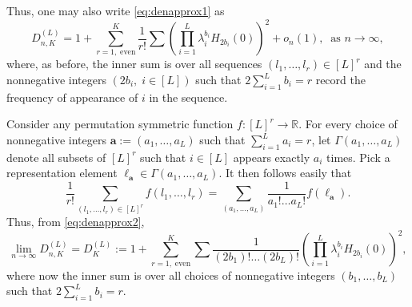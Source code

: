 \documentclass{amsart}
\newcommand{\rr}{\mathbb{R}}
\begin{document}
Thus, one may also write \eqref{eq:denapprox1} as
\begin{equation}\label{eq:denapprox2}
D_{n,K}^{(L)}= 1 +  \sum_{r=1, \; \text{even}}^K  \frac{1}{r!} \sum \left( \prod_{i=1}^L \lambda_{i}^{b_i} H_{2 b_i}(0)\right)^2 + o_n(1),\;\; \text{as $n\rightarrow \infty$},
\end{equation}
where, as before, the inner sum is over all sequences $(l_1, \ldots, l_r)\in [L]^r$ and the nonnegative integers $(2b_i,\; i\in [L])$ such that $2\sum_{i=1}^L b_i=r$ record the frequency of appearance of $i$ in the sequence.

Consider any permutation symmetric function $f:[L]^r\rightarrow \rr$. For every choice of nonnegative integers $\mathbf{a}:=(a_1, \ldots, a_L)$ such that $\sum_{i=1}^L a_i=r$, let $\Gamma(a_1, \ldots, a_L)$ denote all subsets of $[L]^r$ such that $i\in [L]$ appears exactly $a_i$ times. Pick a representation element $\ell_{\mathbf{a}} \in \Gamma(a_1, \ldots, a_L)$. It then follows easily that 
\[
\frac{1}{r!} \sum_{(l_1, \ldots, l_r)\in [L]^r} f(l_1, \ldots, l_r) = \sum_{(a_1, \ldots, a_L)} \frac{1}{a_1 ! \ldots a_L!}f(\ell_{\mathbf{a}}). 
\]
Thus, from \eqref{eq:denapprox2},
\begin{equation}\label{eq:denapprox3}
\lim_{n\rightarrow \infty}D_{n,K}^{(L)}= D_K^{(L)}:= 1 +  \sum_{r=1, \; \text{even}}^K  \sum \frac{1}{(2b_1)! \ldots (2b_L)!} \left( \prod_{i=1}^L \lambda_{i}^{b_i} H_{2 b_i}(0)\right)^2,
\end{equation}
where now the inner sum is over all choices of nonnegative integers $(b_1, \ldots, b_L)$ such that $2\sum_{i=1}^Lb_i=r$.
\end{document}

